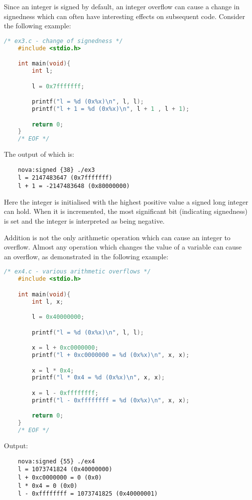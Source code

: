\documentclass{iacrtrans}
\begin{document}
Since an integer is signed by default, an integer overflow can cause a
change in signedness which can often have interesting effects on subsequent
code.  Consider the following example:

\begin{lstlisting}[language=c]
    /* ex3.c - change of signedness */
    #include <stdio.h>

    int main(void){
        int l;

        l = 0x7fffffff;

        printf("l = %d (0x%x)\n", l, l);
        printf("l + 1 = %d (0x%x)\n", l + 1 , l + 1);

        return 0;
    }
    /* EOF */
\end{lstlisting}

The output of which is:

\begin{verbatim}
    nova:signed {38} ./ex3
    l = 2147483647 (0x7fffffff)
    l + 1 = -2147483648 (0x80000000)
\end{verbatim}

Here the integer is initialised with the highest positive value a signed
long integer can hold.  When it is incremented, the most significant bit
(indicating signedness) is set and the integer is interpreted as being
negative.

Addition is not the only arithmetic operation which can cause an integer to
overflow.  Almost any operation which changes the value of a variable can
cause an overflow, as demonstrated in the following example:

\begin{lstlisting}[language=c]
    /* ex4.c - various arithmetic overflows */
    #include <stdio.h>

    int main(void){
        int l, x;

        l = 0x40000000;

        printf("l = %d (0x%x)\n", l, l);

        x = l + 0xc0000000;
        printf("l + 0xc0000000 = %d (0x%x)\n", x, x);

        x = l * 0x4;
        printf("l * 0x4 = %d (0x%x)\n", x, x);

        x = l - 0xffffffff;
        printf("l - 0xffffffff = %d (0x%x)\n", x, x);

        return 0;
    }
    /* EOF */
\end{lstlisting}

Output:

\begin{verbatim}
    nova:signed {55} ./ex4
    l = 1073741824 (0x40000000)
    l + 0xc0000000 = 0 (0x0)
    l * 0x4 = 0 (0x0)
    l - 0xffffffff = 1073741825 (0x40000001)
\end{verbatim}
\end{document}
